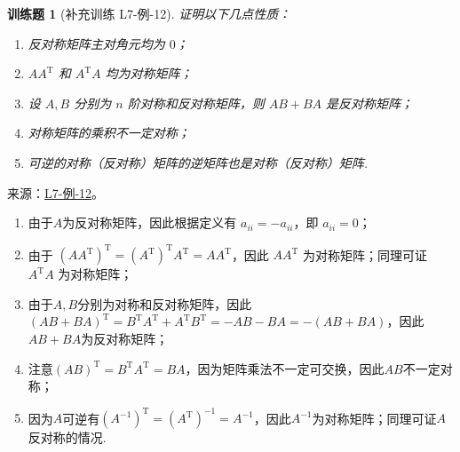 \documentclass[UTF8,12pt,a4paper,fontset=fandol]{ctexart}
\newtheorem{exercise}{训练题}[section]
\begin{document}
\begin{exercise}[补充训练 L7-例-12]\label{prob:L7-例-12}
证明以下几点性质：
    \begin{enumerate}
        \item 反对称矩阵主对角元均为 $0$；

        \item $AA^\mathrm{T}$ 和 $A^\mathrm{T}A$ 均为对称矩阵；

        \item 设 $A, B$ 分别为 $n$ 阶对称和反对称矩阵，则 $AB + BA$ 是反对称矩阵；

        \item 对称矩阵的乘积不一定对称；

        \item 可逆的对称（反对称）矩阵的逆矩阵也是对称（反对称）矩阵.
    \end{enumerate}
\end{exercise}
\noindent 来源：\href{https://github.com/yhwu-is/Linear-Algebra-Left-Undone/blob/new/%E8%AE%B2%E4%B9%89/%E4%B8%93%E9%A2%98/7%20%E7%BA%BF%E6%80%A7%E6%98%A0%E5%B0%84%E7%9F%A9%E9%98%B5%E8%A1%A8%E7%A4%BA%E4%B8%8E%E7%9F%A9%E9%98%B5%E8%BF%90%E7%AE%97%E5%9F%BA%E7%A1%80.tex}{L7-例-12}。
\begin{solve}
\begin{enumerate}
        \item 由于$A$为反对称矩阵，因此根据定义有 $a_{ii} = -a_{ii}$，即 $a_{ii} = 0$；

        \item 由于 $(AA^\mathrm{T})^\mathrm{T} = (A^\mathrm{T})^\mathrm{T}A^\mathrm{T} = AA^\mathrm{T}$，因此 $AA^\mathrm{T}$ 为对称矩阵；同理可证 $A^\mathrm{T}A$ 为对称矩阵；

        \item 由于$A,B$分别为对称和反对称矩阵，因此$(AB+BA)^\mathrm{T}=B^\mathrm{T}A^\mathrm{T}+A^\mathrm{T}B^\mathrm{T}=-AB-BA=-(AB+BA)$，因此$AB+BA$为反对称矩阵；

        \item 注意$(AB)^\mathrm{T}=B^\mathrm{T}A^\mathrm{T}=BA$，因为矩阵乘法不一定可交换，因此$AB$不一定对称；

        \item 因为$A$可逆有$(A^{-1})^\mathrm{T}=(A^\mathrm{T})^{-1}=A^{-1}$，因此$A^{-1}$为对称矩阵；同理可证$A$反对称的情况.
    \end{enumerate}
\end{solve}
\end{document}
